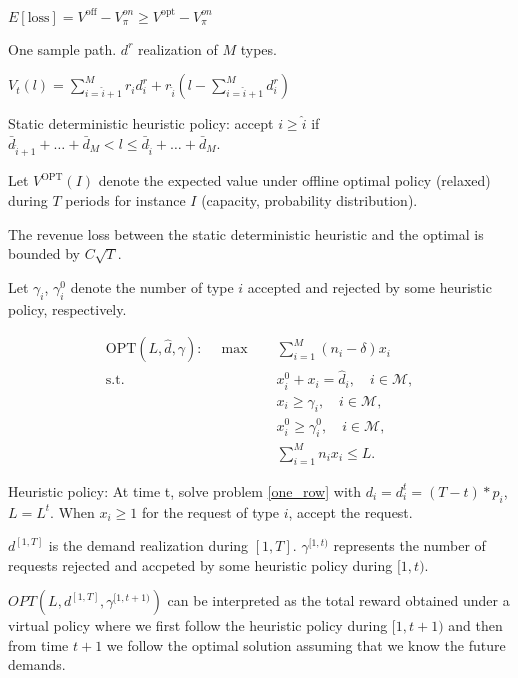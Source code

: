 

$E[\text{loss}] = V^{\text{off}} - V_{\pi}^{on} \geq V^{\text{opt}} - V_{\pi}^{on}$

One sample path. $d^{r}$ realization of $M$ types. 

$V_{t}(l) = \sum_{i = \hat{i}+1}^{M} r_{i} d_{i}^{r} + r_{\hat{i}}(l- \sum_{i= \hat{i}+1}^{M} d_{i}^{r})$

Static deterministic heuristic policy: accept $i \geq \hat{i}$ if $\bar{d}_{\hat{i}+1}+ \ldots + \bar{d}_{M} < l \leq \bar{d}_{\hat{i}}+ \ldots + \bar{d}_{M}$.


Let $V^{\text{OPT}}(I)$ denote the expected value under offline optimal policy (relaxed) during $T$ periods for instance $I$ (capacity, probability distribution).

The revenue loss between the static deterministic heuristic and the optimal is bounded by $C \sqrt{T}$.

Let $\gamma_{i}$, $\gamma_{i}^{0}$ denote the number of type $i$ accepted and rejected by some heuristic policy, respectively.



\begin{align*}
    \text{OPT}(L, \hat{d}, \gamma): \quad \max \quad & \sum_{i = 1}^{M} (n_i - \delta) x_{i} \\
    \text {s.t.} \quad & x_{i}^{0} + x_{i} = \hat{d}_{i}, \quad i \in \mathcal{M},  \\ 
    & x_{i} \geq \gamma_{i}, \quad i \in \mathcal{M}, \\
    & x_{i}^{0} \geq \gamma_{i}^{0}, \quad i \in \mathcal{M}, \\
    & \sum_{i=1}^{M} n_{i} x_{i} \leq L.
\end{align*}

Heuristic policy: At time t, solve problem \eqref{one_row} with $d_{i} = d_{i}^{t} = (T-t) * p_{i}$, $L = L^{t}$. When $x_{i}\geq 1$ for the request of type $i$, accept the request.



$d^{[1, T]}$ is the demand realization during $[1, T]$. $\gamma^{[1, t)}$ represents the number of requests rejected and accpeted by some heuristic policy during $[1, t)$. 

$OPT(L, d^{[1, T]}, \gamma^{[1,t+1)})$ can be interpreted as the total reward obtained under a virtual policy where we first follow the heuristic policy during $[1, t+1)$ and then from time $t+1$ we follow the optimal solution assuming that we know the future demands.

